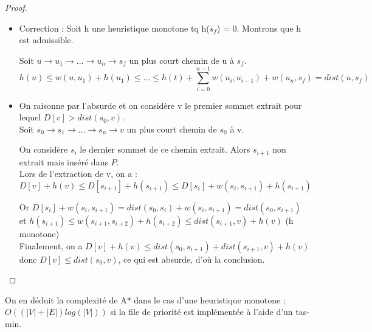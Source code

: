 \begin{proof}
	\begin{itemize}[label=$\bullet$]
		\item Correction : Soit h une heuristique monotone tq h($s_{f}$) = 0. Montrons que h est admissible. 
		
		Soit $u \rightarrow u_{1} \rightarrow ... \rightarrow u_{n} \rightarrow s_{f}$ un plus court chemin de u à $s_{f}$. \\
		
		$$h(u) \le w(u, u_{1}) + h(u_{1}) \le ... \le h(t) + \sum_{i = 0}^{n-1}{w(u_{i}, u_{i-1})} + w(u_{n}, s_{f}) = dist(u, s_{f})$$
		
		\item On raisonne par l'absurde et on considère v le premier sommet extrait pour lequel $D[v] > dist(s_{0}, v)$. \\
		
		Soit  $s_{0} \rightarrow s_{1} \rightarrow ... \rightarrow s_{n} \rightarrow v$ un plus court chemin de $s_{0}$ à v.
		
		On considère $s_{i}$ le dernier sommet de ce chemin extrait. Alors $s_{i+1}$ non extrait mais inséré dans $P$.  \\
		
		Lors de l'extraction de v, on a : 
		$$ D[v] + h(v) \le D[s_{i+1}] + h(s_{i+1}) \le D[s_{i}] + w(s_{i}, s_{i+1}) + h(s_{i+1}) $$ 
		
		Or $D[s_{i}] + w(s_{i}, s_{i+1}) = dist(s_{0}, s_{i}) + w(s_{i}, s_{i+1}) = dist(s_{0}, s_{i+1})$ \\		
		et $h(s_{i+1}) \le w(s_{i+1}, s_{i+2}) + h(s_{i+2}) \le dist(s_{i+1}, v) + h(v)$ (h monotone)\\
		
		Finalement, on a $ D[v] + h(v) \le dist(s_{0}, s_{i+1}) + dist(s_{i+1}, v) + h(v)$ \\
		donc $ D[v] \le dist(s_{0}, v) $, ce qui est absurde, d'où la conclusion.
	\end{itemize}
\end{proof}

\begin{rem}
On en déduit la complexité de A* dans le cas d'une heuristique monotone : $O((|V|+|E|)log(|V|))$ si la file de priorité est implémentée à l'aide d'un tas-min. 
\end{rem}

